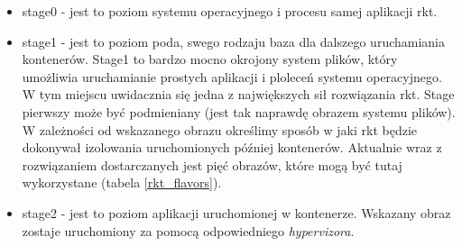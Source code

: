 \documentclass[10pt,a4paper,titlepage,twoside]{report}
\begin{document}
\begin{itemize}
\item stage0 - jest to poziom systemu operacyjnego i procesu samej aplikacji rkt.
\item stage1 - jest to poziom poda, swego rodzaju baza dla dalszego uruchamiania kontenerów. Stage1 to bardzo mocno okrojony system plików, który umożliwia uruchamianie prostych aplikacji i ploleceń systemu operacyjnego. W tym miejscu uwidacznia się jedna z największych sił rozwiązania rkt. Stage pierwszy może być podmieniany (jest tak naprawdę obrazem systemu plików). W zależności od wskazanego obrazu określimy sposób w jaki rkt będzie dokonywał izolowania uruchomionych później kontenerów. Aktualnie wraz z rozwiązaniem dostarczanych jest pięć obrazów, które mogą być tutaj wykorzystane (tabela \ref{rkt_flavors}).
\item stage2 - jest to poziom aplikacji uruchomionej w kontenerze. Wskazany obraz zostaje uruchomiony za pomocą odpowiedniego \textit{hypervizora}.
\end{itemize}
\end{document}
